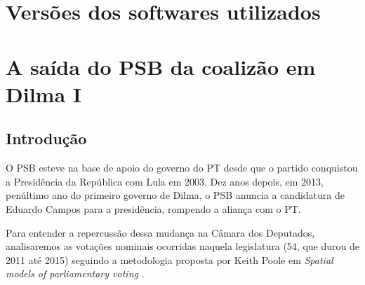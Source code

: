 \documentclass[a4paper,titlepage]{ppgi}\usepackage[]{graphicx}\usepackage[]{color}
\makeatletter
\newenvironment{kframe}{%
 \def\at@end@of@kframe{}%
 \ifinner\ifhmode%
  \def\at@end@of@kframe{\end{minipage}}%
  \begin{minipage}{\columnwidth}%
 \fi\fi%
 \def\FrameCommand##1{\hskip\@totalleftmargin \hskip-\fboxsep
 \colorbox{shadecolor}{##1}\hskip-\fboxsep
     \hskip-\linewidth \hskip-\@totalleftmargin \hskip\columnwidth}%
 \MakeFramed {\advance\hsize-\width
   \@totalleftmargin\z@ \linewidth\hsize
   \@setminipage}}%
 {\par\unskip\endMakeFramed%
 \at@end@of@kframe}
\makeatother
\begin{document}
\chapter{Versões dos softwares utilizados}

\begin{kframe}


{\ttfamily\noindent\bfseries\color{errorcolor}{\#\# Error in system(paste(which, shQuote(names[i])), intern = TRUE, ignore.stderr = TRUE): cannot popen '/usr/bin/which 'uname' 2>/dev/null', probable reason 'Cannot allocate memory'}}\end{kframe}



\chapter{A saída do PSB da coalizão em Dilma I}\label{cap:analise-saida-psb}

\section{Introdução}

O PSB esteve na base de apoio do governo do PT desde que o partido conquistou a
Presidência da República com Lula em 2003. Dez anos depois, em 2013, penúltimo
ano do primeiro governo de Dilma, o PSB anuncia a candidatura de Eduardo Campos
para a presidência, rompendo a aliança com o PT.

Para entender a repercussão dessa mudança na Câmara dos Deputados, analisaremos
as votações nominais ocorridas naquela legislatura (54\textordfeminine, que
durou de 2011 até 2015) seguindo a metodologia proposta por Keith Poole em
\emph{Spatial models of parliamentary voting} \cite{Poole2005}.
\end{document}
